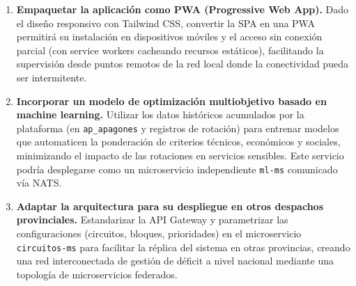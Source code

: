 \begin{enumerate}
    \item \textbf{Empaquetar la aplicación como PWA (Progressive Web App).} Dado el diseño responsivo con Tailwind CSS, convertir la SPA en una PWA permitirá su instalación en dispositivos móviles y el acceso sin conexión parcial (con service workers cacheando recursos estáticos), facilitando la supervisión desde puntos remotos de la red local donde la conectividad pueda ser intermitente.

    \item \textbf{Incorporar un modelo de optimización multiobjetivo basado en machine learning.} Utilizar los datos históricos acumulados por la plataforma (en \texttt{ap\_apagones} y registros de rotación) para entrenar modelos que automaticen la ponderación de criterios técnicos, económicos y sociales, minimizando el impacto de las rotaciones en servicios sensibles. Este servicio podría desplegarse como un microservicio independiente \texttt{ml-ms} comunicado vía NATS.

    \item \textbf{Adaptar la arquitectura para su despliegue en otros despachos provinciales.} Estandarizar la API Gateway y parametrizar las configuraciones (circuitos, bloques, prioridades) en el microservicio \texttt{circuitos-ms} para facilitar la réplica del sistema en otras provincias, creando una red interconectada de gestión de déficit a nivel nacional mediante una topología de microservicios federados.
\end{enumerate}